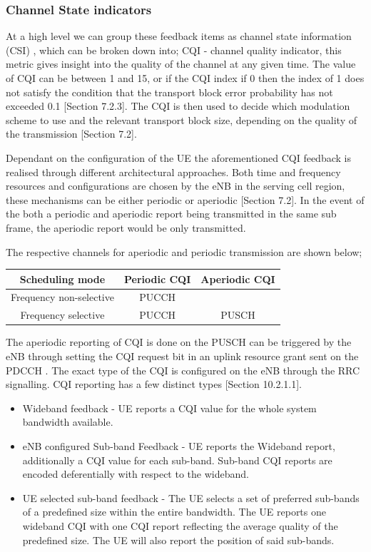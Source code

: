 \documentclass{article}
\begin{document}
\subsubsection{Channel State indicators}
At a high level we can group these feedback items as channel state information (CSI) , which can be broken down into;
CQI - channel quality indicator, this metric gives insight into the quality of the channel at any given time. The value of CQI can be between 1 and 15, or if the CQI index if 0 then the index of 1 does not satisfy the condition that the transport block error probability has not exceeded 0.1 \cite{ETSITS136213}[Section 7.2.3]. The CQI is then used to decide which modulation scheme to use and the relevant transport block size, depending on the quality of the transmission \cite{ETSITS136213}[Section 7.2]. 

Dependant on the configuration of the UE the aforementioned CQI feedback is realised through different architectural approaches. Both time and frequency resources and configurations are chosen by the eNB in the serving cell region, these mechanisms can be either periodic or aperiodic \cite{ETSITS136213}[Section 7.2]. In the event of the both a periodic and aperiodic report being transmitted in the same sub frame, the aperiodic report would be only transmitted. 

The respective channels for aperiodic and periodic transmission are shown below;
\begin{center}
 \begin{tabular}{||c c c||} 
 \hline
 Scheduling mode & Periodic CQI & Aperiodic CQI  \\ [0.1ex] 
 \hline\hline
 Frequency non-selective & PUCCH &  \\ 
 \hline
 Frequency selective  & PUCCH & PUSCH\\
 \hline
\end{tabular}
\end{center}
The aperiodic reporting of CQI is done on the PUSCH can be triggered by the eNB through setting the CQI request bit in an uplink resource grant sent on the PDCCH . The exact type of the CQI is configured on the eNB through the RRC signalling. CQI reporting has a few distinct types \cite{umts_sesia}[Section 10.2.1.1]. 
\begin{itemize}
    \item Wideband feedback - UE reports a CQI value for the whole system bandwidth available.
    \item eNB configured Sub-band Feedback - UE reports the Wideband report, additionally a CQI value for each sub-band. Sub-band CQI reports are encoded deferentially with respect to the wideband.
    \item UE selected sub-band feedback - The UE selects a set of preferred sub-bands of a predefined size within the entire bandwidth.  The UE reports one wideband CQI with one CQI report reflecting the average quality of the predefined size. The UE will also report the position of said sub-bands.
    
\end{itemize}
\end{document}
